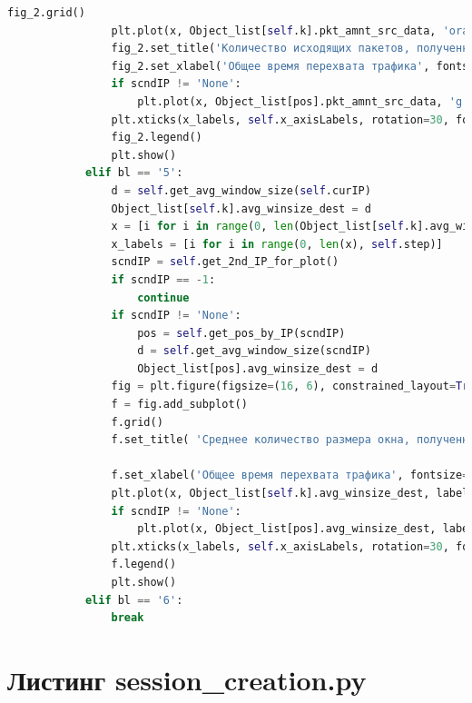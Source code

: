 \documentclass[spec, och, diploma]{SCWorks}
\begin{document}
\begin{lstlisting}[language=Python]
                fig_2.grid()
                plt.plot(x, Object_list[self.k].pkt_amnt_src_data, 'orange', label=self.curIP)
                fig_2.set_title('Количество исходящих пакетов, полученных за единицу времени (общий порт {self.curPort})', fontsize=15 )
                fig_2.set_xlabel('Общее время перехвата трафика', fontsize=15)
                if scndIP != 'None':
                    plt.plot(x, Object_list[pos].pkt_amnt_src_data, 'g', label=scndIP)
                plt.xticks(x_labels, self.x_axisLabels, rotation=30, fontsize=8)
                fig_2.legend()
                plt.show()
            elif bl == '5':
                d = self.get_avg_window_size(self.curIP)
                Object_list[self.k].avg_winsize_dest = d
                x = [i for i in range(0, len(Object_list[self.k].avg_winsize_dest))]
                x_labels = [i for i in range(0, len(x), self.step)]
                scndIP = self.get_2nd_IP_for_plot()
                if scndIP == -1:
                    continue
                if scndIP != 'None':
                    pos = self.get_pos_by_IP(scndIP)
                    d = self.get_avg_window_size(scndIP)
                    Object_list[pos].avg_winsize_dest = d
                fig = plt.figure(figsize=(16, 6), constrained_layout=True)
                f = fig.add_subplot()
                f.grid()
                f.set_title( 'Среднее количество размера окна, полученных за единицу времени (общий порт {self.curPort})', fontsize=15 )

                f.set_xlabel('Общее время перехвата трафика', fontsize=15)
                plt.plot(x, Object_list[self.k].avg_winsize_dest, label=self.curIP + '(получатель)')
                if scndIP != 'None':
                    plt.plot(x, Object_list[pos].avg_winsize_dest, label=scndIP + '(получатель)')
                plt.xticks(x_labels, self.x_axisLabels, rotation=30, fontsize=10)
                f.legend()
                plt.show()
            elif bl == '6':
                break
    \end{lstlisting}

    \section{Листинг session\_creation.py}
\end{document}
